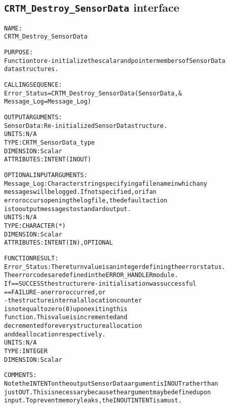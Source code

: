 \subsection{\texttt{CRTM\_Destroy\_SensorData} interface}
  \label{sec:CRTM_Destroy_SensorData_interface}
  \begin{alltt}
 
  NAME:
        CRTM_Destroy_SensorData
  
  PURPOSE:
        Function to re-initialize the scalar and pointer members of SensorData
        data structures.
 
  CALLING SEQUENCE:
        Error_Status = CRTM_Destroy_SensorData( SensorData             , &
                                                Message_Log=Message_Log  )
 
  OUTPUT ARGUMENTS:
        SensorData:   Re-initialized SensorData structure.
                      UNITS:      N/A
                      TYPE:       CRTM_SensorData_type
                      DIMENSION:  Scalar
                      ATTRIBUTES: INTENT(IN OUT)
 
  OPTIONAL INPUT ARGUMENTS:
        Message_Log:  Character string specifying a filename in which any
                      messages will be logged. If not specified, or if an
                      error occurs opening the log file, the default action
                      is to output messages to standard output.
                      UNITS:      N/A
                      TYPE:       CHARACTER(*)
                      DIMENSION:  Scalar
                      ATTRIBUTES: INTENT(IN), OPTIONAL
 
  FUNCTION RESULT:
        Error_Status: The return value is an integer defining the error status.
                      The error codes are defined in the ERROR_HANDLER module.
                      If == SUCCESS the structure re-initialisation was successful
                         == FAILURE - an error occurred, or
                                    - the structure internal allocation counter
                                      is not equal to zero (0) upon exiting this
                                      function. This value is incremented and
                                      decremented for every structure allocation
                                      and deallocation respectively.
                      UNITS:      N/A
                      TYPE:       INTEGER
                      DIMENSION:  Scalar
 
  COMMENTS:
        Note the INTENT on the output SensorData argument is IN OUT rather than
        just OUT. This is necessary because the argument may be defined upon
        input. To prevent memory leaks, the IN OUT INTENT is a must.
 
  \end{alltt}
